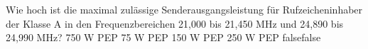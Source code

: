     {Wie hoch ist die maximal zulässige Senderausgangsleistung für Rufzeicheninhaber der Klasse A in den Frequenzbereichen 21,000 bis 21,450 MHz und 24,890 bis 24,990 MHz?}
    {750 W PEP}
    {75 W PEP}
    {150 W PEP}
    {250 W PEP}
    {false}{false}